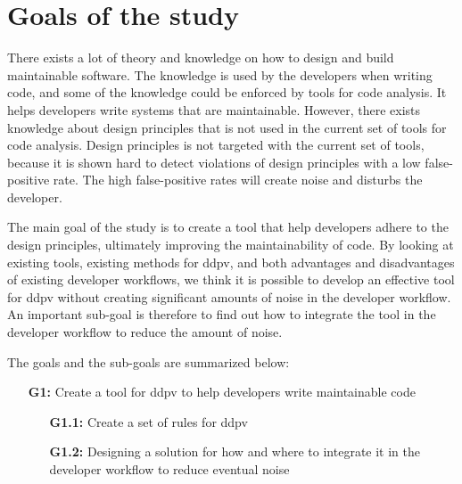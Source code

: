 \documentclass{report}
\begin{document}
\section{Goals of the study}

There exists a lot of theory and knowledge on how to design and build maintainable software. The knowledge is used by the developers when writing code, and some of the knowledge could be enforced by tools for code analysis. It helps developers write systems that are maintainable. However, there exists knowledge about design principles that is not used in the current set of tools for code analysis. Design principles is not targeted with the current set of tools, because it is shown hard to detect violations of design principles with a low false-positive rate. The high false-positive rates will create noise and disturbs the developer.

The main goal of the study is to create a tool that help developers adhere to the design principles, ultimately improving the maintainability of code.  By looking at existing tools, existing methods for \gls{ddpv}, and both advantages and disadvantages of existing developer workflows, we think it is possible to develop an effective tool for \gls{ddpv} without creating significant amounts of noise in the developer workflow. An important sub-goal is therefore to find out how to integrate the tool in the developer workflow to reduce the amount of noise. 

The goals and the sub-goals are summarized below:

\begin{enumerate}
    \item [\textbf{G1:}] Create a tool for \gls{ddpv} to help developers write maintainable code
    \begin{enumerate}
        \item [\textbf{G1.1:}] Create a set of rules for \gls{ddpv}
        \item [\textbf{G1.2:}]Designing a solution for how and where to integrate it in the developer workflow to reduce eventual noise
    \end{enumerate}
\end{enumerate}
\end{document}
